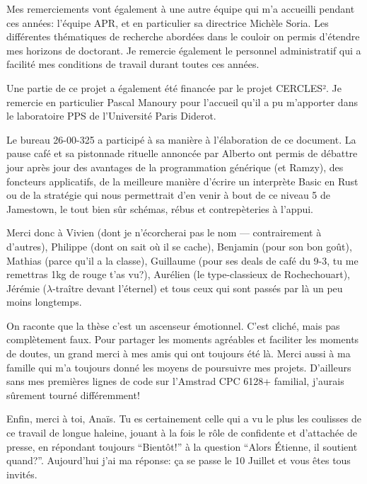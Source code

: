 {%

Mes remerciements vont également à une autre équipe qui m'a accueilli pendant
ces années: l'équipe APR, et en particulier sa directrice Michèle Soria. Les
différentes thématiques de recherche abordées dans le couloir on permis
d'étendre mes horizons de doctorant. Je remercie également le personnel
administratif qui a facilité mes conditions de travail durant toutes ces années.

Une partie de ce projet a également été financée par le projet CERCLES². Je
remercie en particulier Pascal Manoury pour l'accueil qu'il a pu m'apporter dans
le laboratoire PPS de l'Université Paris Diderot.


\setlength{\marginparwidth}{30mm}
Le bureau 26-00-325 a participé à sa manière à l'élaboration de ce document. La
pause café et sa pistonnade rituelle annoncée par Alberto ont permis de débattre
jour après jour des avantages de la programmation générique (et Ramzy), des
foncteurs applicatifs, de la meilleure manière d'écrire un interprète Basic en
Rust ou de la stratégie qui nous permettrait d'en venir à bout de ce niveau 5 de
Jamestown, le tout bien sûr schémas, rébus et contrepèteries à l'appui.

Merci donc à Vivien (dont je n'écorcherai pas le nom --- contrairement à
d'autres), Philippe (dont on sait où il se cache), Benjamin (pour son bon goût),
Mathias (parce qu'il a la classe), Guillaume (pour ses deals de café du 9-3, tu
me remettras 1kg de rouge t'as vu?), Aurélien (le type-classieux de
Rochechouart), Jérémie ($λ$-traître devant l'éternel) et tous ceux qui sont
passés par là un peu moins longtemps.


On raconte que la thèse c'est un ascenseur émotionnel. C'est cliché, mais pas
complètement faux. Pour partager les moments agréables et faciliter les moments
de doutes, un grand merci à mes amis qui ont toujours été là. Merci aussi à ma
famille qui m'a toujours donné les moyens de poursuivre mes projets. D'ailleurs
sans mes premières lignes de code sur l'Amstrad CPC 6128+ familial, j'aurais
sûrement tourné différemment!


Enfin, merci à toi, Anaïs. Tu es certainement celle qui a vu le plus les
coulisses de ce travail de longue haleine, jouant à la fois le rôle de
confidente et d'attachée de presse, en répondant toujours \enquote{Bientôt!} à
la question \enquote{Alors Étienne, il soutient quand?}. Aujourd'hui j'ai ma
réponse: ça se passe le 10 Juillet et vous êtes tous invités.

}
